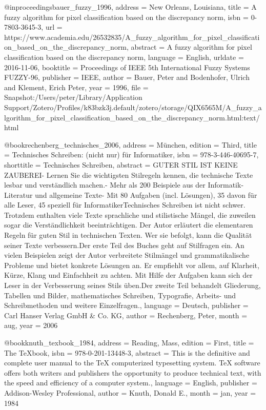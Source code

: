 {{@inproceedings{bauer_fuzzy_1996,
  address   = {New Orleans, Louisiana},
  title     = {A fuzzy algorithm for pixel classification based on the discrepancy norm},
  isbn      = {0-7803-3645-3},
  url       = {https://www.academia.edu/26532835/A_fuzzy_algorithm_for_pixel_classification_based_on_the_discrepancy_norm},
  abstract  = {A fuzzy algorithm for pixel classification based on the discrepancy norm},
  language  = {English},
  urldate   = {2016-11-06},
  booktitle = {Proceedings of {IEEE} 5th {International} {Fuzzy} {Systems} {FUZZY}-96},
  publisher = {IEEE},
  author    = {Bauer, Peter and Bodenhofer, Ulrich and Klement, Erich Peter},
  year      = {1996},
  file      = {Snapshot:/Users/peter/Library/Application Support/Zotero/Profiles/k83bzk3j.default/zotero/storage/QIX6565M/A_fuzzy_algorithm_for_pixel_classification_based_on_the_discrepancy_norm.html:text/html}
}

@book{rechenberg_technisches_2006,
  address    = {M{\"u}nchen},
  edition    = {Third},
  title      = {Technisches {Schreiben}: (nicht nur) f{\"u}r {Informatiker}},
  isbn       = {978-3-446-40695-7},
  shorttitle = {Technisches {Schreiben}},
  abstract   = {GUTER STIL IST KEINE ZAUBEREI- Lernen Sie die wichtigsten Stilregeln kennen, die technische Texte lesbar und verst{\"a}ndlich machen.- Mehr als 200 Beispiele aus der Informatik-Literatur und allgemeine Texte- Mit 80 Aufgaben (incl. L{\"o}sungen), 35 davon f{\"u}r alle Leser, 45 speziell f{\"u}r InformatikerTechnisches Schreiben ist nicht schwer. Trotzdem enthalten viele Texte sprachliche und stilistische M{\"a}ngel, die zuweilen sogar die Verst{\"a}ndlichkeit beeintr{\"a}chtigen. Der Autor erl{\"a}utert die elementaren Regeln f{\"u}r guten Stil in technischen Texten. Wer sie befolgt, kann die Qualit{\"a}t seiner Texte verbessern.Der erste Teil des Buches geht auf Stilfragen ein. An vielen Beispielen zeigt der Autor verbreitete Stilm{\"a}ngel und grammatikalische Probleme und bietet konkrete L{\"o}sungen an. Er empfiehlt vor allem, auf Klarheit, K{\"u}rze, Klang und Einfachheit zu achten. Mit Hilfe der Aufgaben kann sich der Leser in der Verbesserung seines Stils {\"u}ben.Der zweite Teil behandelt Gliederung, Tabellen und Bilder, mathematisches Schreiben, Typografie, Arbeits- und Schreibmethoden und weitere Einzelfragen.},
  language   = {Deutsch},
  publisher  = {Carl Hanser Verlag GmbH \& Co. KG},
  author     = {Rechenberg, Peter},
  month      = aug,
  year       = {2006}
}

@book{knuth_texbook_1984,
  address   = {Reading, Mass},
  edition   = {First},
  title     = {The {TeXbook}},
  isbn      = {978-0-201-13448-3},
  abstract  = {This is the definitive and complete user manual to the TeX computerized typesetting system. TeX software offers both writers and publishers the opportunity to produce technical text, with the speed and efficiency of a computer system.},
  language  = {English},
  publisher = {Addison-Wesley Professional},
  author    = {Knuth, Donald E.},
  month     = jan,
  year      = {1984}
}

}}

